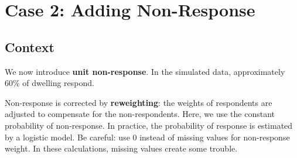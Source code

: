 \documentclass[
]{article}
\newenvironment{Shaded}{\begin{snugshade}}{\end{snugshade}}
\newcommand{\DecValTok}[1]{\textcolor[rgb]{0.00,0.00,0.81}{#1}}
\newcommand{\FloatTok}[1]{\textcolor[rgb]{0.00,0.00,0.81}{#1}}
\newcommand{\FunctionTok}[1]{\textcolor[rgb]{0.13,0.29,0.53}{\textbf{#1}}}
\newcommand{\NormalTok}[1]{#1}
\newcommand{\OtherTok}[1]{\textcolor[rgb]{0.56,0.35,0.01}{#1}}
\newcommand{\SpecialCharTok}[1]{\textcolor[rgb]{0.81,0.36,0.00}{\textbf{#1}}}
\begin{document}
\section{Case 2: Adding Non-Response}\label{case-2-adding-non-response}

\subsection{Context}\label{context-1}

We now introduce \textbf{unit non-response}. In the simulated data,
approximately 60\% of dwelling respond.

\begin{Shaded}
\end{Shaded}

Non-response is corrected by \textbf{reweighting}: the weights of
respondents are adjusted to compensate for the non-respondents. Here, we
use the constant probability of non-response. In practice, the
probability of response is estimated by a logistic model. Be careful:
use 0 instead of missing values for non-response weight. In these
calculations, missing values create some trouble.

\begin{Shaded}
\end{Shaded}
\end{document}
